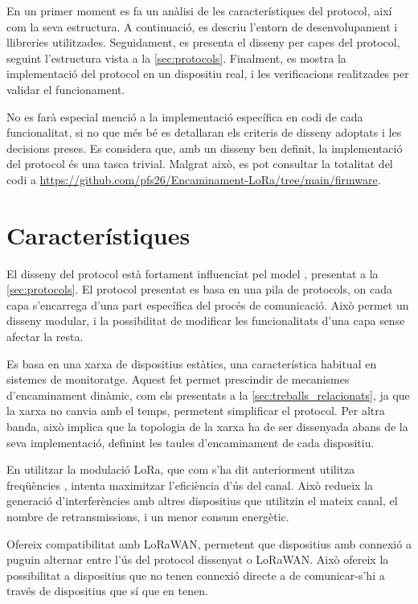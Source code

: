 \documentclass{tfgitic}[2024/07/01]
\begin{document}
En un primer moment es fa un anàlisi de les característiques del protocol, així com la seva estructura. A continuació, es descriu l'entorn de desenvolupament i llibreries utilitzades. Seguidament, es presenta el disseny per capes del protocol, seguint l'estructura vista a la \autoref{sec:protocols}. Finalment, es mostra la implementació del protocol en un dispositiu real, i les verificacions realitzades per validar el funcionament.

No es farà especial menció a la implementació específica en codi de cada funcionalitat, si no que més bé es detallaran els criteris de disseny adoptats i les decisions preses. Es considera que, amb un disseny ben definit, la implementació del protocol és una tasca trivial. Malgrat això, es pot consultar la totalitat del codi a \url{https://github.com/pfs26/Encaminament-LoRa/tree/main/firmware}.

\section{Característiques}
El disseny del protocol està fortament influenciat pel model , presentat a la \autoref{sec:protocols}. El protocol presentat es basa en una pila de protocols, on cada capa s'encarrega d'una part específica del procés de comunicació. Això permet un disseny modular, i la possibilitat de modificar les funcionalitats d'una capa sense afectar la resta.

Es basa en una xarxa de dispositius estàtics, una característica habitual en sistemes de monitoratge. Aquest fet permet prescindir de mecanismes d'encaminament dinàmic, com els presentats a la \autoref{sec:treballs_relacionats}, ja que la xarxa no canvia amb el temps, permetent simplificar el protocol. Per altra banda, això implica que la topologia de la xarxa ha de ser dissenyada abans de la seva implementació, definint les taules d'encaminament de cada dispositiu.

En utilitzar la modulació LoRa, que com s'ha dit anteriorment utilitza freqüències , intenta maximitzar l'eficiència d'ús del canal. Això redueix la generació d'interferències amb altres dispositius que utilitzin el mateix canal, el nombre de retransmissions, i un menor consum energètic.

Ofereix compatibilitat amb LoRaWAN, permetent que dispositius amb connexió a  puguin alternar entre l'ús del protocol dissenyat o LoRaWAN. Això ofereix la possibilitat a dispositius que no tenen connexió directe a  de comunicar-s'hi a través de dispositius que sí que en tenen. 
\end{document}
